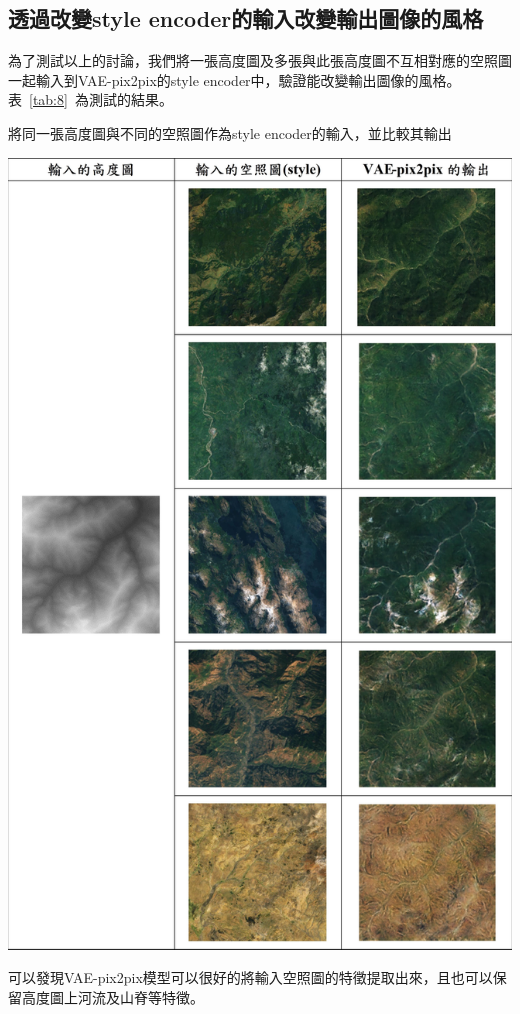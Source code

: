 \documentclass[a4paper, 12pt]{article}
\begin{document}
\subsection{透過改變style encoder的輸入改變輸出圖像的風格}
為了測試以上的討論，我們將一張高度圖及多張與此張高度圖不互相對應的空照圖一起輸入到VAE-pix2pix的style encoder中，驗證能改變輸出圖像的風格。表~\ref{tab:8}~為測試的結果。
\begin{table}[htbp]
    \centering
    \caption{將同一張高度圖與不同的空照圖作為style encoder的輸入，並比較其輸出}
    \label{tab:8}
    \includegraphics[width=0.8\linewidth]{fig/tab8.jpg}
\end{table}
可以發現VAE-pix2pix模型可以很好的將輸入空照圖的特徵提取出來，且也可以保留高度圖上河流及山脊等特徵。
\end{document}
